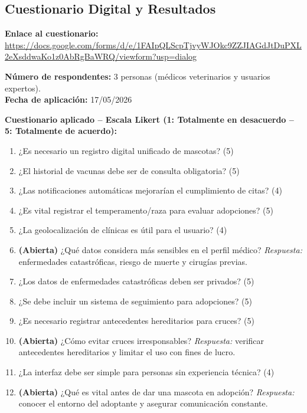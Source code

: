 \documentclass[journal,onecolumn]{IEEEtran}
\begin{document}
\subsection{Cuestionario Digital y Resultados}

\textbf{Enlace al cuestionario:} \\ \url{https://docs.google.com/forms/d/e/1FAIpQLScpTjvyWJOkc9ZZJIAGdJtDuPXL2eXsddwaKo1z0AbRgBaWRQ/viewform?usp=dialog}

\textbf{Número de respondentes:} 3 personas (médicos veterinarios y usuarios
expertos).\\
\textbf{Fecha de aplicación:} 17/05/2026

\textbf{Cuestionario aplicado -- Escala Likert (1: Totalmente en desacuerdo
-- 5: Totalmente de acuerdo):}

\begin{enumerate}[leftmargin=*]
  \item ¿Es necesario un registro digital unificado de mascotas? (5)
  \item ¿El historial de vacunas debe ser de consulta obligatoria? (5)
  \item ¿Las notificaciones automáticas mejorarían el cumplimiento de citas? (4)
  \item ¿Es vital registrar el temperamento/raza para evaluar adopciones? (5)
  \item ¿La geolocalización de clínicas es útil para el usuario? (4)
  \item \textbf{(Abierta)} ¿Qué datos considera más sensibles en el perfil
  médico? \textit{Respuesta:} enfermedades catastróficas, riesgo de muerte y
  cirugías previas.
  \item ¿Los datos de enfermedades catastróficas deben ser privados? (5)
  \item ¿Se debe incluir un sistema de seguimiento para adopciones? (5)
  \item ¿Es necesario registrar antecedentes hereditarios para cruces? (5)
  \item \textbf{(Abierta)} ¿Cómo evitar cruces irresponsables? \textit{Respuesta:}
  verificar antecedentes hereditarios y limitar el uso con fines de lucro.
  \item ¿La interfaz debe ser simple para personas sin experiencia técnica? (4)
  \item \textbf{(Abierta)} ¿Qué es vital antes de dar una mascota en adopción?
  \textit{Respuesta:} conocer el entorno del adoptante y asegurar comunicación
  constante.
\end{enumerate}
\end{document}
